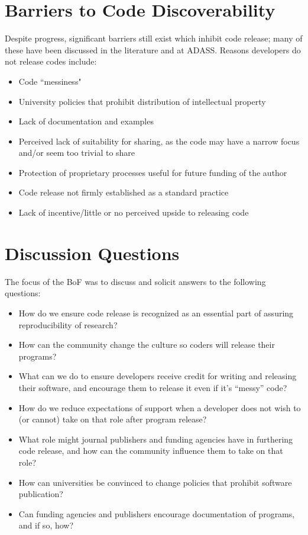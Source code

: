 \section{Barriers to Code Discoverability}

Despite progress, significant barriers still exist which inhibit code release; many of these have been discussed in the literature and at ADASS. Reasons developers do not release codes include:

\begin{itemize}\addtolength{\itemsep}{-0.5\baselineskip}
\item Code ``messiness" \citep{barnes2010}
\item University policies that prohibit distribution of intellectual property
\item Lack of documentation and examples
\item Perceived lack of suitability for sharing, as the code may have a narrow focus and/or seem too trivial to share
\item Protection of proprietary processes useful for future funding of the author
\item Code release not firmly established as a standard practice
\item Lack of incentive/little or no perceived upside to releasing code
\end{itemize}

\section{Discussion Questions}

The focus of the BoF was to discuss and solicit answers to the following questions:

\begin{itemize}\addtolength{\itemsep}{-0.5\baselineskip}
\item How do we ensure code release is recognized as an essential part of assuring reproducibility of research?
\item How can the community change the culture so coders will release their programs?
\item What can we do to ensure developers receive credit for writing and releasing their software, and encourage them to release it even if it's ``messy'' code?
\item How do we reduce expectations of support when a developer does not wish to (or cannot) take on that role after program release?
\item What role might journal publishers and funding agencies have in furthering code release, and how can the community influence them to take on that role?
\item How can universities be convinced to change policies that prohibit software publication?
\item Can funding agencies and publishers encourage documentation of programs, and if so, how?
\end{itemize}

